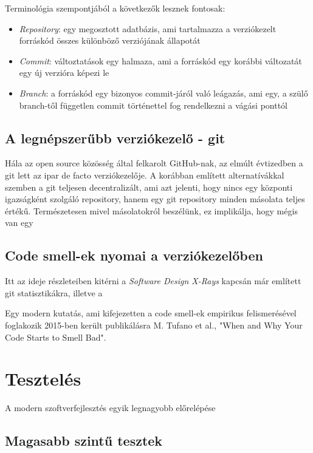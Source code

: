 Terminológia szempontjából a következők lesznek fontosak:
\begin{itemize}
    \item \textit{Repository}: egy megosztott adatbázis, ami tartalmazza a verziókezelt forráskód összes különböző verziójának állapotát
    \item \textit{Commit}: változtatások egy halmaza, ami a forráskód egy korábbi változatát egy új verzióra képezi le
    \item \textit{Branch}: a forráskód egy bizonyos commit-járól való leágazás, ami egy, a szülő branch-től független commit történettel fog rendelkezni a vágási ponttól
\end{itemize}

\subsection{A legnépszerűbb verziókezelő - git}

Hála az open source közösség által felkarolt GitHub-nak, az elmúlt évtizedben a git lett az ipar de facto verziókezelője. A korábban említett alternatívákkal szemben a git teljesen decentralizált, ami azt jelenti, hogy nincs egy központi igazságként szolgáló repository, hanem egy git repository minden másolata teljes értékű. Természetesen mivel másolatokról beszélünk, ez implikálja, hogy mégis van egy

\subsection{Code smell-ek nyomai a verziókezelőben}

Itt az ideje részleteiben kitérni a \textit{Software Design X-Rays}\cite{tornhillXrays} kapcsán már említett git statisztikákra, illetve a

Egy modern kutatás, ami kifejezetten a code smell-ek empirikus felismerésével foglakozik 2015-ben került publikálásra M. Tufano et al., "When and Why Your Code Starts to Smell Bad"\cite{codeSmells}.

\section{Tesztelés}

A modern szoftverfejlesztés egyik legnagyobb előrelépése

\subsection{Magasabb szintű tesztek}

